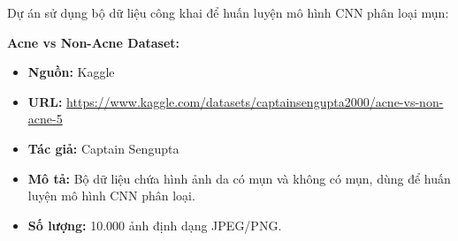 ﻿Dự án sử dụng bộ dữ liệu công khai để huấn luyện mô hình CNN phân loại mụn:

\textbf{Acne vs Non-Acne Dataset:}
\begin{itemize}[noitemsep]
    \item \textbf{Nguồn:} Kaggle
    \item \textbf{URL:} \url{https://www.kaggle.com/datasets/captainsengupta2000/acne-vs-non-acne-5}
    \item \textbf{Tác giả:} Captain Sengupta
    \item \textbf{Mô tả:} Bộ dữ liệu chứa hình ảnh da có mụn và không có mụn, dùng để huấn luyện mô hình CNN phân loại.
    \item \textbf{Số lượng:} 10.000 ảnh định dạng JPEG/PNG.
\end{itemize}
